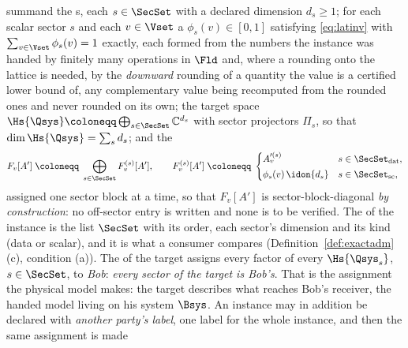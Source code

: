 \begin{definition}
\begin{enumerate}[label=(I\arabic*),leftmargin=3.0em]
  summand the
  s,
  each $s\in\SecSet$ with a declared dimension $d_s\ge1$; for each scalar
  sector $s$ and each $v\in\Vset$ a
  $\phi_s(v)\in[0,1]$ satisfying \eqref{eq:latinv} with
  $\sum_{v\in\Vset}\phi_s(v)=1$ exactly, each formed from the numbers the
  instance was handed by finitely many operations in $\Fld$ and, where a
  rounding onto the lattice is needed, by the \emph{downward} rounding of a
  quantity the value is a certified lower bound of, any complementary value
  being recomputed from the rounded ones and never rounded on its own; the
  target space $\Hs{\Qsys}\coloneqq\bigoplus_{s\in\SecSet}\mathbb{C}^{d_s}$
  with sector projectors $\Pi_s$, so that $\dim\Hs{\Qsys}=\sum_sd_s$; and the
  \begin{equation}\label{eq:instance-target}
    F_v[A']\;\coloneqq\;\bigoplus_{s\in\SecSet}F^{(s)}_v[A'],
    \qquad
    F^{(s)}_v[A']\;\coloneqq\;
    \begin{cases}
      A'^{(s)}_v & s\in\SecSet_{\mathrm{dat}},\\[2pt]
      \phi_s(v)\,\idon{d_s} & s\in\SecSet_{\mathrm{sc}},
    \end{cases}
  \end{equation}
  assigned one sector block at a time, so that $F_v[A']$ is
  sector-block-diagonal \emph{by construction}: no off-sector entry is
  written and none is to be verified. The  of the instance
  is the list $\SecSet$ with its order, each sector's dimension and its kind
  (data or scalar), and it is what a consumer compares
  (Definition~\ref{def:exactadm}\,(c), condition (a)). The
  of the target assigns every factor of every $\Hs{\Qsys_s}$,
  $s\in\SecSet$, to \emph{Bob}: \emph{every sector of the target is Bob's}.
  That is the assignment the physical model makes: the target describes what
  reaches Bob's receiver, the handed model living on his system $\Bsys$. An
  instance may in addition be declared with \emph{another party's label},
  one label for the whole instance, and then the same assignment is made

\end{enumerate}
\end{definition}
